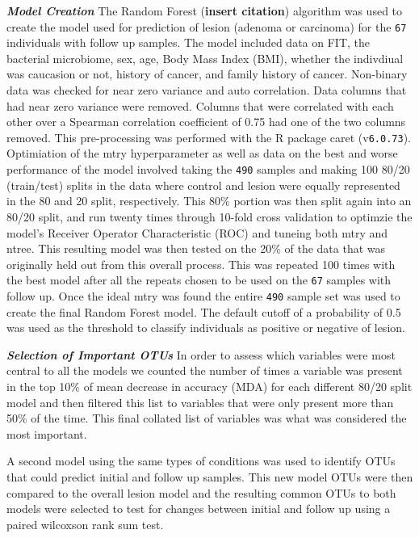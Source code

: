 \documentclass[12pt,]{article}
\begin{document}
\textbf{\emph{Model Creation}} The Random Forest (\textbf{insert
citation}) algorithm was used to create the model used for prediction of
lesion (adenoma or carcinoma) for the \texttt{67} individuals with
follow up samples. The model included data on FIT, the bacterial
microbiome, sex, age, Body Mass Index (BMI), whether the indivdiual was
caucasion or not, history of cancer, and family history of cancer.
Non-binary data was checked for near zero variance and auto correlation.
Data columns that had near zero variance were removed. Columns that were
correlated with each other over a Spearman correlation coefficient of
0.75 had one of the two columns removed. This pre-processing was
performed with the R package caret (v\texttt{6.0.73}). Optimiation of
the mtry hyperparameter as well as data on the best and worse
performance of the model involved taking the \texttt{490} samples and
making 100 80/20 (train/test) splits in the data where control and
lesion were equally represented in the 80 and 20 split, respectively.
This 80\% portion was then split again into an 80/20 split, and run
twenty times through 10-fold cross validation to optimzie the model's
Receiver Operator Characteristic (ROC) and tuneing both mtry and ntree.
This resulting model was then tested on the 20\% of the data that was
originally held out from this overall process. This was repeated 100
times with the best model after all the repeats chosen to be used on the
\texttt{67} samples with follow up. Once the ideal mtry was found the
entire \texttt{490} sample set was used to create the final Random
Forest model. The default cutoff of a probability of 0.5 was used as the
threshold to classify individuals as positive or negative of lesion.

\textbf{\emph{Selection of Important OTUs}} In order to assess which
variables were most central to all the models we counted the number of
times a variable was present in the top 10\% of mean decrease in
accuracy (MDA) for each different 80/20 split model and then filtered
this list to variables that were only present more than 50\% of the
time. This final collated list of variables was what was considered the
most important.

A second model using the same types of conditions was used to identify
OTUs that could predict initial and follow up samples. This new model
OTUs were then compared to the overall lesion model and the resulting
common OTUs to both models were selected to test for changes between
initial and follow up using a paired wilcoxson rank sum test.
\end{document}
